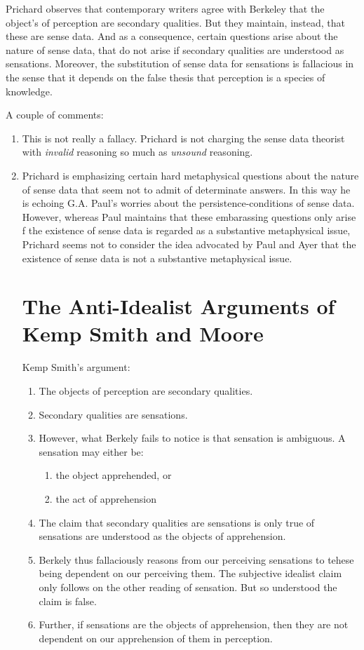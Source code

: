 \documentclass[11pt]{article}
\begin{document}
Prichard observes that contemporary writers agree with Berkeley that the object's of perception are secondary qualities. But they maintain, instead, that these are sense data. And as a consequence, certain questions arise about the nature of sense data, that do not arise if secondary qualities are understood as sensations. Moreover, the substitution of sense data for sensations is fallacious in the sense that it depends on the false thesis that perception is a species of knowledge.

A couple of comments:
\begin{enumerate}
    \item This is not really a fallacy. Prichard is not charging the sense data theorist with \emph{invalid} reasoning so much as \emph{unsound} reasoning.
    \item Prichard is emphasizing certain hard metaphysical questions about the nature of sense data that seem not to admit of determinate answers. In this way he is echoing G.A. Paul's worries about the persistence-conditions of sense data. However, whereas Paul maintains that these embarassing questions only arise f the existence of sense data is regarded as a substantive metaphysical issue, Prichard seems not to consider the idea advocated by Paul and Ayer that the existence of sense data is not a substantive metaphysical issue.

\section{The Anti-Idealist Arguments of Kemp Smith and Moore} %
\label{sec:the_anti_idealist_arguments_of_kemp_smith_and_moore}
Kemp Smith's argument:
\begin{enumerate}
    \item The objects of perception are secondary qualities.
    \item Secondary qualities are sensations.
    \item However, what Berkely fails to notice is that sensation is ambiguous. A sensation may either be:
    \begin{enumerate}
        \item the object apprehended, or
        \item the act of apprehension
    \end{enumerate}
    \item The claim that secondary qualities are sensations is only true of sensations are understood as the objects of apprehension.
    \item Berkely thus fallaciously reasons from our perceiving sensations to tehese being dependent on our perceiving them. The subjective idealist claim only follows on the other reading of sensation. But so understood the claim is false.
    \item Further, if sensations are the objects of apprehension, then they are not dependent on our apprehension of them in perception.
\end{enumerate}


\end{enumerate}
\end{document}
